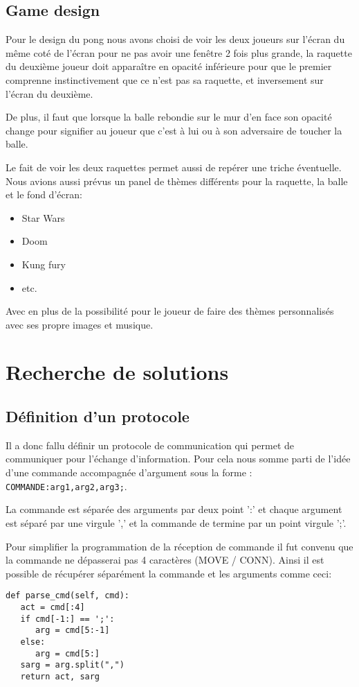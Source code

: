 \documentclass[12pt]{report}
\begin{document}
\chapter{Game design}
Pour le design du pong nous avons choisi de voir les deux joueurs sur l'écran
du même coté de l'écran pour ne pas avoir une fenêtre 2 fois plus grande,
la raquette du deuxième joueur doit apparaître en opacité inférieure pour que
le premier comprenne instinctivement que ce n'est pas sa raquette, et inversement
sur l'écran du deuxième.

De plus, il faut que lorsque la balle rebondie sur le mur d'en face son opacité
change pour signifier au joueur que c'est à lui ou à son adversaire de toucher la
balle.

Le fait de voir les deux raquettes permet aussi de repérer une triche éventuelle.\\

Nous avions aussi prévus un panel de thèmes différents pour la
raquette, la balle et le fond d'écran:
\begin{itemize}
\item Star Wars
\item Doom
\item Kung fury
\item etc.
\end{itemize}
Avec en plus de la possibilité pour le joueur de faire des thèmes personnalisés
avec ses propre images et musique.

\part{Recherche de solutions}
\chapter{Définition d'un protocole}
Il a donc fallu définir un protocole de communication qui permet de communiquer
pour l'échange d'information.
Pour cela nous somme parti de l'idée d'une commande accompagnée d'argument sous la
forme : \texttt{COMMANDE:arg1,arg2,arg3;}.

La commande est séparée des arguments par deux point ':' et chaque argument est
séparé par une virgule ',' et la commande de termine par un point virgule ';'.

Pour simplifier la programmation de la réception de commande il fut convenu
que la commande ne dépasserai pas 4 caractères (MOVE / CONN). Ainsi il est
possible de récupérer séparément la commande et les arguments comme ceci:
\begin{verbatim}
def parse_cmd(self, cmd):
   act = cmd[:4]
   if cmd[-1:] == ';':
      arg = cmd[5:-1]
   else:
      arg = cmd[5:]
   sarg = arg.split(",")
   return act, sarg
\end{verbatim}
\end{document}
